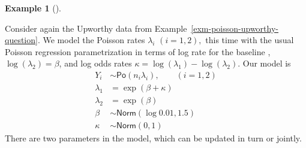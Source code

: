 \documentclass[
  11pt,
  letterpaper,
]{scrbook}
\theoremstyle{definition}
\newtheorem{example}{Example}[chapter]
\theoremstyle{definition}
\theoremstyle{definition}
\theoremstyle{plain}
\theoremstyle{remark}
\begin{document}
\begin{example}[]\protect\hypertarget{exm-upworthy-question}{}\label{exm-upworthy-question}

Consider again the Upworthy data from
Example~\ref{exm-poisson-upworthy-question}. We model the Poisson rates
\(\lambda_i\) \((i=1,2),\) this time with the usual Poisson regression
parametrization in terms of log rate for the baseline ,
\(\log(\lambda_2) = \beta\), and log odds rates
\(\kappa = \log(\lambda_1) - \log(\lambda_2)\). Our model is
\begin{align*}
Y_{i} &\sim \mathsf{Po}(n_i\lambda_i), \qquad (i=1,2)\\
\lambda_1 &= \exp(\beta + \kappa) \\
\lambda_2 &= \exp(\beta) \\
\beta & \sim \mathsf{Norm}(\log 0.01, 1.5) \\
\kappa &\sim \mathsf{Norm}(0, 1)
\end{align*} There are two parameters in the model, which can be updated
in turn or jointly.


\end{example}
\end{document}
